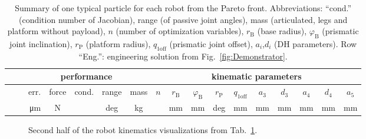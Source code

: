 \documentclass{svproc}
\begin{document}
\begin{table}[p]
\centering
\caption{Summary of one typical particle for each robot from the Pareto front. Abbreviations: ``cond.'' (condition number of Jacobian), range (of passive joint angles), mass (articulated, legs and platform without payload), $n$ (number of optimization variables), $r_\mathrm{B}$ (base radius), $\varphi_\mathrm{B}$ (prismatic joint inclination), $r_\mathrm{P}$ (platform radius), $q_{1\mathrm{off}}$ (prismatic joint offset), $a_i$,$d_i$ (DH parameters). Row ``Eng.'': engineering solution from Fig.~\ref{fig:Demonstrator}.}
\vspace{-0.5cm} %
\begin{tabular}[t]{|c c|r|r|r|r|r|r|r|r|r|r|r|r|r|r|r|}
\hline
& & \multicolumn{5}{c|}{\textbf{performance}} & \multicolumn{10}{c|}{\textbf{kinematic parameters}} \\
\hline
& & \multicolumn{1}{r|}{err.} & \multicolumn{1}{r|}{force} & \multicolumn{1}{r|}{cond.} & \multicolumn{1}{c|}{range} &  \multicolumn{1}{c|}{mass} & \multicolumn{1}{c|}{$n$} &
\multicolumn{1}{c|}{$r_\mathrm{B}$} & \multicolumn{1}{c|}{$\varphi_\mathrm{B}$} & \multicolumn{1}{c|}{$r_\mathrm{P}$} & \multicolumn{1}{c|}{$q_{1\mathrm{off}}$} & \multicolumn{1}{c|}{$a_3$} & \multicolumn{1}{c|}{$d_3$} & \multicolumn{1}{c|}{$a_4$} & \multicolumn{1}{c|}{$d_4$} & \multicolumn{1}{c|}{$a_5$} \\
& & \multicolumn{1}{c|}{\SI{}{\micro\metre}}  & \multicolumn{1}{c|}{N} & \multicolumn{1}{c|}{} & \multicolumn{1}{c|}{deg} & \multicolumn{1}{c|}{kg} & & \multicolumn{1}{c|}{mm} & \multicolumn{1}{c|}{mm} & \multicolumn{1}{c|}{deg} & \multicolumn{1}{c|}{mm} & \multicolumn{1}{c|}{mm} & \multicolumn{1}{c|}{mm} & \multicolumn{1}{c|}{mm} & \multicolumn{1}{c|}{mm} & \multicolumn{1}{c|}{mm} \\
\hline

\hline
\end{tabular}
\label{tab:results}
\end{table}
%
\begin{figure}[p]
\vspace{-0.2cm} %
\centering

\caption{Second half of the robot kinematics visualizations from Tab.~\ref{tab:results}.}
\label{fig:robot_examples2}
\end{figure} 
\end{document}
